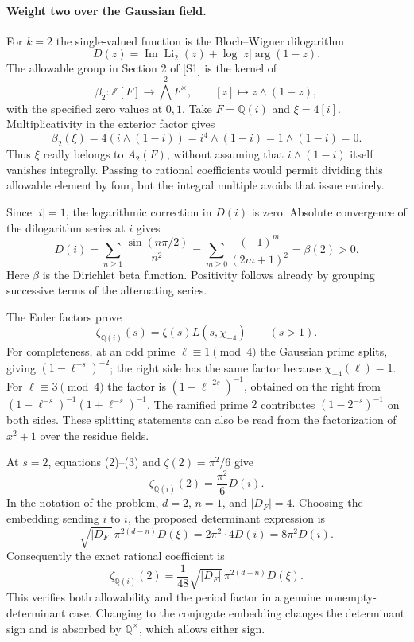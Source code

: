 \documentclass[11pt]{article}
\begin{document}
\paragraph{Weight two over the Gaussian field.}
For $k=2$ the single-valued function is the Bloch--Wigner dilogarithm
\[
 D(z)=\operatorname{Im}\operatorname{Li}_2(z)
       +\log|z|\arg(1-z).
\]
The allowable group in Section 2 of [S1] is the kernel of
\[
 \beta_2:\mathbb Z[F]\longrightarrow\bigwedge^2 F^\times,
 \qquad [z]\longmapsto z\wedge(1-z),
                                                               \tag{1}
\]
with the specified zero values at $0,1$. Take $F=\mathbb Q(i)$ and $\xi=4[i]$. Multiplicativity in the exterior factor gives
\[
 \beta_2(\xi)=4(i\wedge(1-i))
             =i^4\wedge(1-i)=1\wedge(1-i)=0.
\]
Thus $\xi$ really belongs to $A_2(F)$, without assuming that $i\wedge(1-i)$ itself vanishes integrally. Passing to rational coefficients would permit dividing this allowable element by four, but the integral multiple avoids that issue entirely.

Since $|i|=1$, the logarithmic correction in $D(i)$ is zero. Absolute convergence of the dilogarithm series at $i$ gives
\[
 D(i)=\sum_{n\ge1}\frac{\sin(n\pi/2)}{n^2}
     =\sum_{m\ge0}\frac{(-1)^m}{(2m+1)^2}
     =\beta(2)>0.                                           \tag{2}
\]
Here $\beta$ is the Dirichlet beta function. Positivity follows already by grouping successive terms of the alternating series.

The Euler factors prove
\[
 \zeta_{\mathbb Q(i)}(s)=\zeta(s)L(s,\chi_{-4})\qquad(s>1).
                                                               \tag{3}
\]
For completeness, at an odd prime $\ell\equiv1\pmod4$ the Gaussian prime splits, giving $(1-\ell^{-s})^{-2}$; the right side has the same factor because $\chi_{-4}(\ell)=1$. For $\ell\equiv3\pmod4$ the factor is $(1-\ell^{-2s})^{-1}$, obtained on the right from $(1-\ell^{-s})^{-1}(1+\ell^{-s})^{-1}$. The ramified prime $2$ contributes $(1-2^{-s})^{-1}$ on both sides. These splitting statements can also be read from the factorization of $x^2+1$ over the residue fields.

At $s=2$, equations (2)--(3) and $\zeta(2)=\pi^2/6$ give
\[
 \zeta_{\mathbb Q(i)}(2)=\frac{\pi^2}{6}D(i).
\]
In the notation of the problem, $d=2$, $n=1$, and $|D_F|=4$. Choosing the embedding sending $i$ to $i$, the proposed determinant expression is
\[
 \sqrt{|D_F|}\,\pi^{2(d-n)}D(\xi)
 =2\pi^2\cdot4D(i)=8\pi^2D(i).
\]
Consequently the exact rational coefficient is
\[
 \boxed{\displaystyle
 \zeta_{\mathbb Q(i)}(2)=\frac1{48}
 \sqrt{|D_F|}\,\pi^{2(d-n)}D(\xi).}                         \tag{4}
\]
This verifies both allowability and the period factor in a genuine nonempty-determinant case. Changing to the conjugate embedding changes the determinant sign and is absorbed by $\mathbb Q^\times$, which allows either sign.
\end{document}
